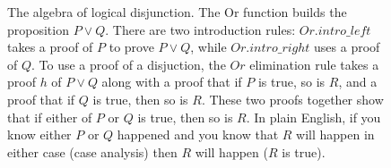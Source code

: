 \documentclass[letterpaper]{article}
\begin{document}
\begin{figure}[h!]
\caption{The algebra of logical disjunction. The Or function builds the proposition
$P \lor Q$. There are two introduction rules: $Or.intro\_left$ takes a proof of $P$ 
to prove $P \lor Q$, while $Or.intro\_right$ uses a proof of $Q$. To use a proof of 
a disjuction, the $Or$ elimination rule takes a proof $h$ of $P \lor Q$ along with 
a proof that if $P$ is true, so is $R$, and a proof that if $Q$ is true, then so is
$R$. These two proofs together show that if either of $P$ or $Q$ is true, then so is
$R$. In plain English, if you know either $P$ or $Q$ happened and you know that $R$
will happen in either case (case analysis) then $R$ will happen ($R$ is true).}\label{fig:tikz_diagram_or_final_bugfix_v2}
\end{figure}
\end{document}

